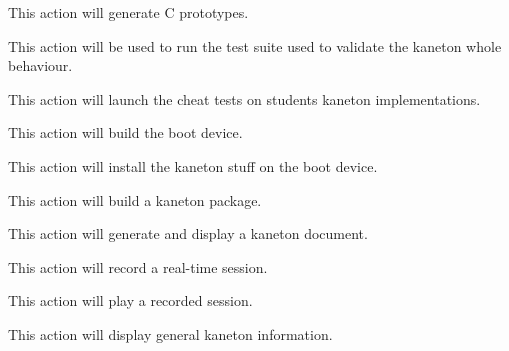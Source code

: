 	{
	  This action will generate C prototypes.

	}

	{
	  This action will be used to run the test suite used to validate
	  the kaneton whole behaviour.

	}

	{
	  This action will launch the cheat tests on students kaneton
	  implementations.


	}

	{
	  This action will build the boot device.

	}

	{
	  This action will install the kaneton stuff on the boot device.

	}

	{
	  This action will build a kaneton package.


	}

	{
	  This action will generate and display a kaneton document.



	}

	{
	  This action will record a real-time session.


	}

	{
	  This action will play a recorded session.


	}

	{
	  This action will display general kaneton information.

	}

